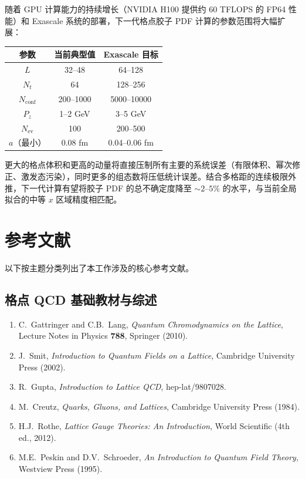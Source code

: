 \documentclass[11pt,a4paper]{ctexart}
\begin{document}
随着 GPU 计算能力的持续增长（NVIDIA H100 提供约 60 TFLOPS 的 FP64 性能）和 Exascale 系统的部署，下一代格点胶子 PDF 计算的参数范围将大幅扩展：

\begin{center}
\begin{tabular}{c c c}
\toprule
\textbf{参数} & \textbf{当前典型值} & \textbf{Exascale 目标} \\
\midrule
$L$ & 32--48 & 64--128 \\
$N_t$ & 64 & 128--256 \\
$N_{\text{conf}}$ & 200--1000 & 5000--10000 \\
$P_z$ & 1--2 GeV & 3--5 GeV \\
$N_{\text{ev}}$ & 100 & 200--500 \\
$a$（最小） & 0.08 fm & 0.04--0.06 fm \\
\bottomrule
\end{tabular}
\end{center}

更大的格点体积和更高的动量将直接压制所有主要的系统误差（有限体积、幂次修正、激发态污染），同时更多的组态数将压低统计误差。结合多格距的连续极限外推，下一代计算有望将胶子 PDF 的总不确定度降至 $\sim 2\text{--}5\%$ 的水平，与当前全局拟合的中等 $x$ 区域精度相匹配。

\section{参考文献}

以下按主题分类列出了本工作涉及的核心参考文献。

\subsection*{格点 QCD 基础教材与综述}
\begin{enumerate}
  \item C.~Gattringer and C.B.~Lang, \textit{Quantum Chromodynamics on the Lattice}, Lecture Notes in Physics \textbf{788}, Springer (2010).
  \item J.~Smit, \textit{Introduction to Quantum Fields on a Lattice}, Cambridge University Press (2002).
  \item R.~Gupta, \textit{Introduction to Lattice QCD}, hep-lat/9807028.
  \item M.~Creutz, \textit{Quarks, Gluons, and Lattices}, Cambridge University Press (1984).
  \item H.J.~Rothe, \textit{Lattice Gauge Theories: An Introduction}, World Scientific (4th ed., 2012).
  \item M.E.~Peskin and D.V.~Schroeder, \textit{An Introduction to Quantum Field Theory}, Westview Press (1995).
\end{enumerate}
\end{document}
